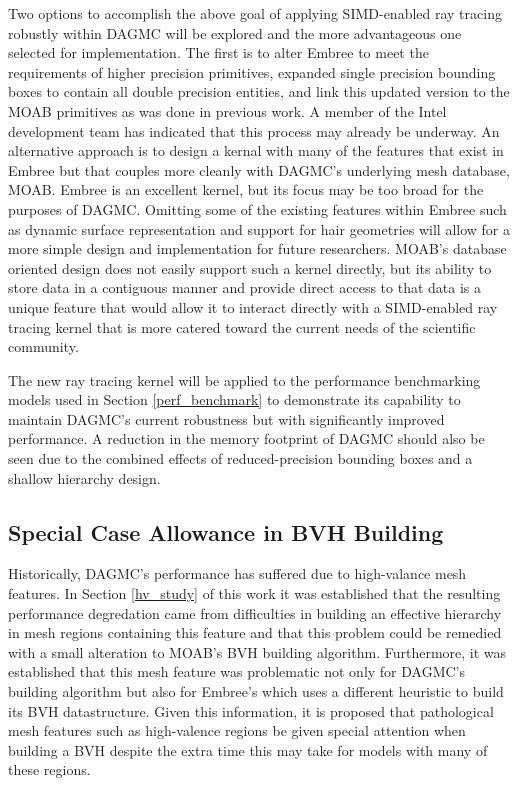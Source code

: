 \documentclass[12pt, a4paper]{article}
\begin{document}
Two options to accomplish the above goal of applying SIMD-enabled ray tracing robustly within DAGMC will be explored and the more advantageous one selected for implementation. The first is to alter Embree to meet the requirements of higher precision primitives, expanded single precision bounding boxes to contain all double precision entities, and link this updated version to the MOAB primitives as was done in previous work. A member of the Intel development team has indicated that this process may already be underway. An alternative approach is to design a kernal with many of the features that exist in Embree but that couples more cleanly with DAGMC's underlying mesh database, MOAB. Embree is an excellent kernel, but its focus may be too broad for the purposes of DAGMC. Omitting some of the existing features within Embree such as dynamic surface representation and support for hair geometries \cite{Woop_2014} will allow for a more simple design and implementation for future researchers. MOAB's database oriented design does not easily support such a kernel directly, but its ability to store data in a contiguous manner and provide direct access to that data is a unique feature that would allow it to interact directly with a SIMD-enabled ray tracing kernel that is more catered toward the current needs of the scientific community.

The new ray tracing kernel will be applied to the performance benchmarking models used in Section \ref{perf_benchmark} to demonstrate its capability to maintain DAGMC's current robustness but with significantly improved performance. A reduction in the memory footprint of DAGMC should also be seen due to the combined effects of reduced-precision bounding boxes and a shallow hierarchy design.

\subsection{Special Case Allowance in BVH Building}

Historically, DAGMC's performance has suffered due to high-valance mesh features. In Section \ref{hv_study} of this work it was established that the resulting performance degredation came from difficulties in building an effective hierarchy in mesh regions containing this feature and that this problem could be remedied with a small alteration to MOAB's BVH building algorithm. Furthermore, it was established that this mesh feature was problematic not only for DAGMC's building algorithm but also for Embree's which uses a different heuristic to build its BVH datastructure. Given this information, it is proposed that pathological mesh features such as high-valence regions be given special attention when building a BVH despite the extra time this may take for models with many of these regions.
\end{document}
